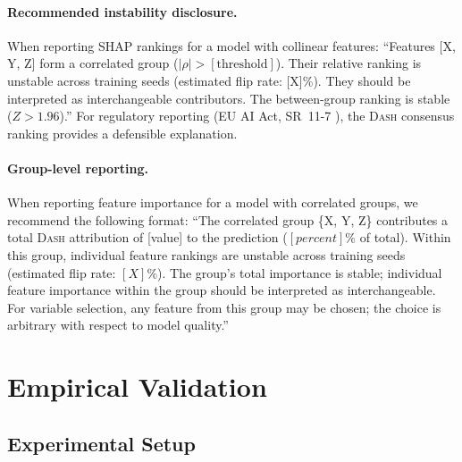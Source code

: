 \documentclass{article}
\newcommand{\DASH}{\textsc{Dash}}
\begin{document}
\paragraph{Recommended instability disclosure.}
When reporting SHAP rankings for a model with collinear features: ``Features [X, Y, Z] form a correlated group ($|\rho| > [\text{threshold}]$). Their relative ranking is unstable across training seeds (estimated flip rate: [X]\%). They should be interpreted as interchangeable contributors. The between-group ranking is stable ($Z > 1.96$).'' For regulatory reporting (EU AI Act, SR~11-7 \citep{occ2011sr117}), the \DASH{} consensus ranking provides a defensible explanation.

\paragraph{Group-level reporting.}
When reporting feature importance for a model with correlated groups, we recommend the following format:
``The correlated group \{X, Y, Z\} contributes a total \DASH{} attribution of [value] to the prediction ($[percent]\%$ of total). Within this group, individual feature rankings are unstable across training seeds (estimated flip rate: $[X]\%$). The group's total importance is stable; individual feature importance within the group should be interpreted as interchangeable. For variable selection, any feature from this group may be chosen; the choice is arbitrary with respect to model quality.''


\section{Empirical Validation}
\label{sec:experiments}

\subsection{Experimental Setup}
\end{document}
